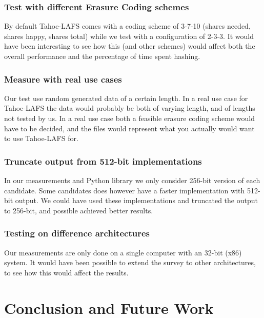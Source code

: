 \documentclass[english,12pt,a4paper]{book}
\begin{document}
\subsection{Test with different Erasure Coding schemes}
By default Tahoe-\ac{LAFS} comes with a coding scheme of 3-7-10 (shares needed,
shares happy, shares total) while we test with a configuration of 2-3-3. It
would have been interesting to see how this (and other schemes) would affect
both the overall performance and the percentage of time spent hashing.

\subsection{Measure with real use cases}
Our test use random generated data of a certain length. In a real use case for
Tahoe-\ac{LAFS} the data would probably be both of varying length, and of
lengths not tested by us. In a real use case both a feasible erasure coding
scheme would have to be decided, and the files would represent what you
actually would want to use Tahoe-\ac{LAFS} for.

\subsection{Truncate output from 512-bit implementations}
In our measurements and Python library we only consider 256-bit version of each
candidate. Some candidates does however have a faster implementation with
512-bit output. We could have used these implementations and truncated the
output to 256-bit, and possible achieved better results.

\subsection{Testing on difference architectures}
Our measurements are only done on a single computer with an 32-bit (x86)
system. It would have been possible to extend the survey to other
architectures, to see how this would affect the results. 

\chapter{Conclusion and Future Work}

\end{document}
